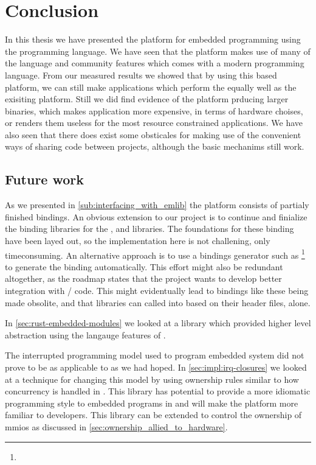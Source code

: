 
\chapter{Conclusion}
\label{chap:conclusion}

In this thesis we have presented the {\rg} platform for embedded programming using the {\rust} programming language.
We have seen that the platform makes use of many of the language and community features which comes with a modern programming language.
From our measured results we showed that by using this {\rust} based platform, we can still make applications which perform the equally well as the exisiting {\C} platform.
Still we did find evidence of the platform prducing larger binaries, which makes {\rust} application more expensive, in terms of hardware choises, or renders them useless for the most resource constrained applications.
We have also seen that there does exist some obsticales for making use of the convenient ways of sharing code between projects, although the basic mechanims still work.


\section{Future work}
\label{chap:future}

As we presented in \autoref{sub:interfacing_with_emlib} the platform consists of partialy finished bindings.
An obvious extension to our project is to continue and finialize the binding libraries for the {\emlib}, {\emdrv} and {\cmsis} libraries.
The foundations for these binding have been layed out, so the implementation here is not challening, only timeconsuming.
An alternative approach is to use a bindings generator such as  \footnote{} to generate the binding automatically.
This effort might also be redundant altogether, as the {\rust} roadmap states that the project wants to develop better integration with {\C}/{\Cpp} code.
This might evidentually lead to bindings like these being made obsolite, and that {\C} libraries can called into based on their header files, alone.

In \autoref{sec:rust-embedded-modules} we looked at a library which provided higher level abstraction using the langauge features of {\rust}.

The interrupted programming model used to program embedded system did not prove to be as applicable to {\rust} as we had hoped.
In \autoref{sec:impl:irq-closures} we looked at a technique for changing this model by using ownership rules similar to how concurrency is handled in {\rust}.
This library has potential to provide a more idiomatic programming style to embedded programs in {\rust} and will make the platform more familiar to {\rust} developers.
This library can be extended to control the ownership of \glspl{mmio} as discussed in \autoref{sec:ownership_allied_to_hardware}.

